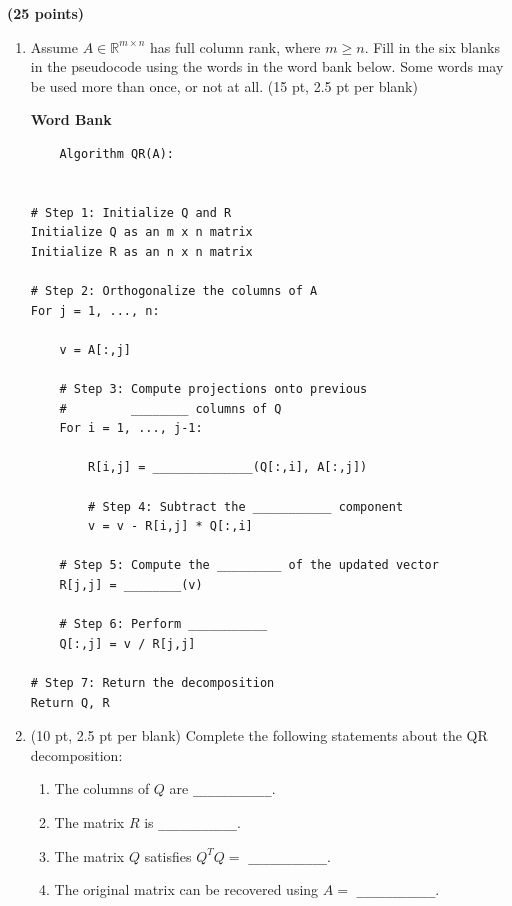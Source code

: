 \documentclass{ximera}
\begin{document}
\newpage
\begin{exercise}
\textbf{(25 points)}
\begin{enumerate}
\item Assume $A \in \mathbb{R}^{m\times n}$ has full column rank, where $m\geq n$. Fill in the six blanks in the pseudocode using the words in the word bank below. Some words may be used more than once, or not at all. (15 pt, 2.5 pt per blank)

\begin{center}
\textbf{Word Bank}\\[0.5em]
\end{center}

\begin{verbatim}
    Algorithm QR(A):


# Step 1: Initialize Q and R
Initialize Q as an m x n matrix
Initialize R as an n x n matrix

# Step 2: Orthogonalize the columns of A
For j = 1, ..., n:

    v = A[:,j]

    # Step 3: Compute projections onto previous
    #         ________ columns of Q
    For i = 1, ..., j-1:

        R[i,j] = ______________(Q[:,i], A[:,j])

        # Step 4: Subtract the ___________ component
        v = v - R[i,j] * Q[:,i]

    # Step 5: Compute the _________ of the updated vector
    R[j,j] = ________(v)

    # Step 6: Perform ___________
    Q[:,j] = v / R[j,j]

# Step 7: Return the decomposition
Return Q, R
\end{verbatim}

\item (10 pt, 2.5 pt per blank) Complete the following statements about the QR decomposition:

\begin{enumerate}
    \item The columns of $Q$ are \verb|___________|.
    \item The matrix $R$ is \verb|___________|.
    \item The matrix $Q$ satisfies $Q^TQ = $ \verb|___________|.
    \item The original matrix can be recovered using $A = $ \verb|___________|.
\end{enumerate}
\end{enumerate}
\end{exercise}
\end{document}
